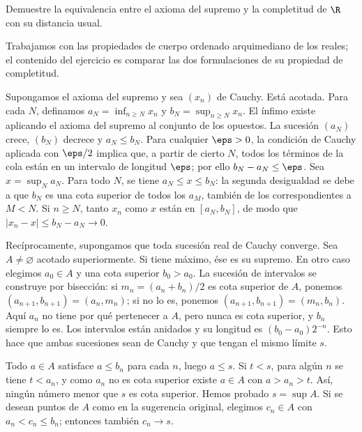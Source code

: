 \begin{ejercicio}\label{ej:lectura-8-2}
Demuestre la equivalencia entre el axioma del supremo y la completitud de $\R$ con su distancia usual.
\end{ejercicio}
\begin{solucion}
Trabajamos con las propiedades de cuerpo ordenado arquimediano de los reales; el contenido del ejercicio es comparar las dos formulaciones de su propiedad de completitud.

Supongamos el axioma del supremo y sea $(x_n)$ de Cauchy. Está acotada. Para cada $N$, definamos $a_N=\inf_{n\geq N}x_n$ y $b_N=\sup_{n\geq N}x_n$. El ínfimo existe aplicando el axioma del supremo al conjunto de los opuestos. La sucesión $(a_N)$ crece, $(b_N)$ decrece y $a_N\leq b_N$. Para cualquier $\eps>0$, la condición de Cauchy aplicada con $\eps/2$ implica que, a partir de cierto $N$, todos los términos de la cola están en un intervalo de longitud $\eps$; por ello $b_N-a_N\leq\eps$. Sea $x=\sup_Na_N$. Para todo $N$, se tiene $a_N\leq x\leq b_N$: la segunda desigualdad se debe a que $b_N$ es una cota superior de todos los $a_M$, también de los correspondientes a $M<N$. Si $n\geq N$, tanto $x_n$ como $x$ están en $[a_N,b_N]$, de modo que $|x_n-x|\leq b_N-a_N\to0$.

Recíprocamente, supongamos que toda sucesión real de Cauchy converge. Sea $A\ne\varnothing$ acotado superiormente. Si tiene máximo, ése es su supremo. En otro caso elegimos $a_0\in A$ y una cota superior $b_0>a_0$. La sucesión de intervalos se construye por bisección: si $m_n=(a_n+b_n)/2$ es cota superior de $A$, ponemos $(a_{n+1},b_{n+1})=(a_n,m_n)$; si no lo es, ponemos $(a_{n+1},b_{n+1})=(m_n,b_n)$. Aquí $a_n$ no tiene por qué pertenecer a $A$, pero nunca es cota superior, y $b_n$ siempre lo es. Los intervalos están anidados y su longitud es $(b_0-a_0)2^{-n}$. Esto hace que ambas sucesiones sean de Cauchy y que tengan el mismo límite $s$.

Todo $a\in A$ satisface $a\leq b_n$ para cada $n$, luego $a\leq s$. Si $t<s$, para algún $n$ se tiene $t<a_n$, y como $a_n$ no es cota superior existe $a\in A$ con $a>a_n>t$. Así, ningún número menor que $s$ es cota superior. Hemos probado $s=\sup A$. Si se desean puntos de $A$ como en la sugerencia original, elegimos $c_n\in A$ con $a_n<c_n\leq b_n$; entonces también $c_n\to s$.
\end{solucion}

